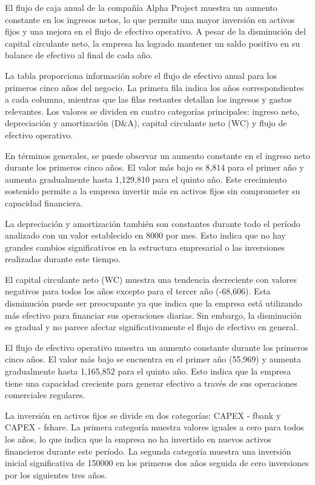 El flujo de caja anual de la compañía Alpha Project muestra un aumento constante en los ingresos netos, lo que permite una mayor inversión en activos fijos y una mejora en el flujo de efectivo operativo. A pesar de la disminución del capital circulante neto, la empresa ha logrado mantener un saldo positivo en su balance de efectivo al final de cada año.

La tabla proporciona información sobre el flujo de efectivo anual para los primeros cinco años del negocio. La primera fila indica los años correspondientes a cada columna, mientras que las filas restantes detallan los ingresos y gastos relevantes. Los valores se dividen en cuatro categorías principales: ingreso neto, depreciación y amortización (D&A), capital circulante neto (WC) y flujo de efectivo operativo.

En términos generales, se puede observar un aumento constante en el ingreso neto durante los primeros cinco años. El valor más bajo es 8,814 para el primer año y aumenta gradualmente hasta 1,129,810 para el quinto año. Este crecimiento sostenido permite a la empresa invertir más en activos fijos sin comprometer su capacidad financiera.

La depreciación y amortización también son constantes durante todo el período analizado con un valor establecido en 8000 por mes. Esto indica que no hay grandes cambios significativos en la estructura empresarial o las inversiones realizadas durante este tiempo.

El capital circulante neto (WC) muestra una tendencia decreciente con valores negativos para todos los años excepto para el tercer año (-68,606). Esta disminución puede ser preocupante ya que indica que la empresa está utilizando más efectivo para financiar sus operaciones diarias. Sin embargo, la disminución es gradual y no parece afectar significativamente el flujo de efectivo en general.

El flujo de efectivo operativo muestra un aumento constante durante los primeros cinco años. El valor más bajo se encuentra en el primer año (55,969) y aumenta gradualmente hasta 1,165,852 para el quinto año. Esto indica que la empresa tiene una capacidad creciente para generar efectivo a través de sus operaciones comerciales regulares.

La inversión en activos fijos se divide en dos categorías: CAPEX - fbank y CAPEX - fshare. La primera categoría muestra valores iguales a cero para todos los años, lo que indica que la empresa no ha invertido en nuevos activos financieros durante este período. La segunda categoría muestra una inversión inicial significativa de 150000 en los primeros dos años seguida de cero inversiones por los siguientes tres años.

